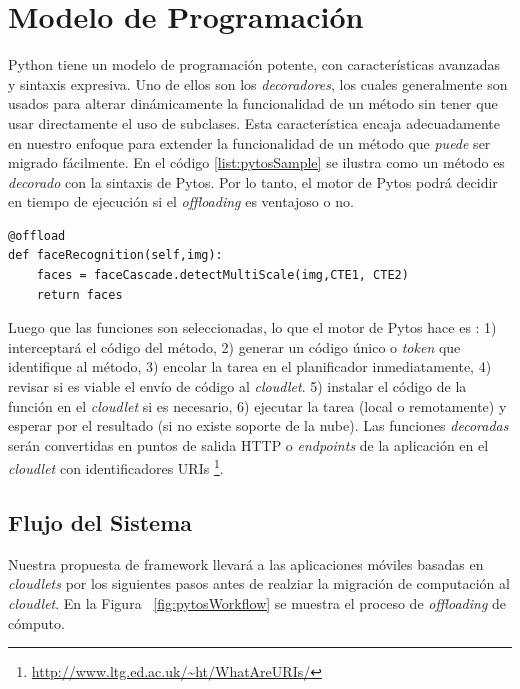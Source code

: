 \section{Modelo de Programación}
\label{sec:programmingModel}
Python tiene un modelo de programación potente, con características avanzadas y sintaxis expresiva. Uno de ellos son los \textit{decoradores},
los cuales generalmente son usados para alterar dinámicamente la funcionalidad de un método sin tener que usar directamente el uso de subclases. 
Esta característica encaja adecuadamente en nuestro enfoque para extender la funcionalidad de un método que \textit{puede} ser migrado fácilmente.
En el código \ref{list:pytosSample} se ilustra como un método es \textit{decorado} con la sintaxis de Pytos. Por lo tanto, el motor de Pytos podrá 
decidir en tiempo de ejecución si el \textit{offloading} es ventajoso o no.

\begin{lstlisting}[caption= Ejemplo del uso de la sintaxis de Pytos sobre un método que \textit{puede} ser migrado, label=list:pytosSample]
@offload
def faceRecognition(self,img):
    faces = faceCascade.detectMultiScale(img,CTE1, CTE2)
    return faces
\end{lstlisting}

\vspace{0.5cm}
Luego que las funciones son seleccionadas, lo que el motor de Pytos hace es : 1) interceptará el código del método, 2) generar un código único o
\emph{token} que identifique al método, 3) encolar la tarea en el planificador inmediatamente, 4) revisar si es viable el envío de código al 
\emph{cloudlet}. 5) instalar el código de la función en el \emph{cloudlet} si es necesario, 6) ejecutar la tarea (local o remotamente) y esperar por 
el resultado (si no existe soporte de la nube). Las funciones \textit{decoradas} serán convertidas en puntos de salida HTTP
o \textit{endpoints} de la aplicación en el \textit{cloudlet} con identificadores URIs \footnote{\url{http://www.ltg.ed.ac.uk/~ht/WhatAreURIs/}}.


\subsection{Flujo del Sistema}
\label{sec:pytosWorkflow}
Nuestra propuesta de framework llevará a las aplicaciones móviles basadas en \textit{cloudlets} por los siguientes pasos antes de realziar la migración
de computación al \textit{cloudlet}. En la Figura ~\ref{fig:pytosWorkflow} se muestra el proceso de \textit{offloading} de cómputo.

